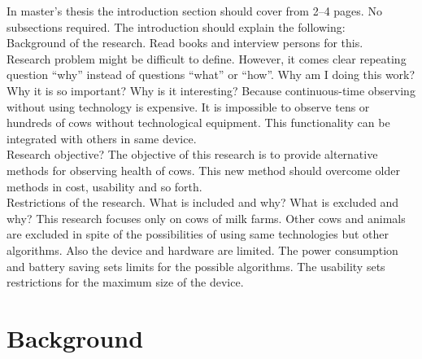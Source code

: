 \documentclass[english,12pt,a4paper,pdftex,elec,utf8]{aaltothesis}
\begin{document}
In master's thesis the introduction section should cover from 2--4 pages. No subsections required. The introduction should explain the following:\\

Background of the research. Read books and interview persons for this.\\


Research problem might be difficult to define. However, it comes clear repeating question ``why'' instead of questions ``what'' or ``how''. Why am I doing this work? Why it is so important? Why is it interesting?  Because continuous-time observing without using technology is expensive. It is impossible to observe tens or hundreds of cows without technological equipment. This functionality can be integrated with others in same device.\\

Research objective? The objective of this research is to provide alternative methods for observing health of cows. This new method should overcome older methods in cost, usability and so forth.\\
 
Restrictions of the research. What is included and why? What is excluded and why? This research focuses only on cows of milk farms. Other cows and animals are excluded in spite of the possibilities of using same technologies but other algorithms. Also the device and hardware are limited. The power consumption and battery saving sets limits for the possible algorithms. The usability sets restrictions for the maximum size of the device. \\



\clearpage 
 
\section{Background} \label{backgroundsection}
 
\end{document}

